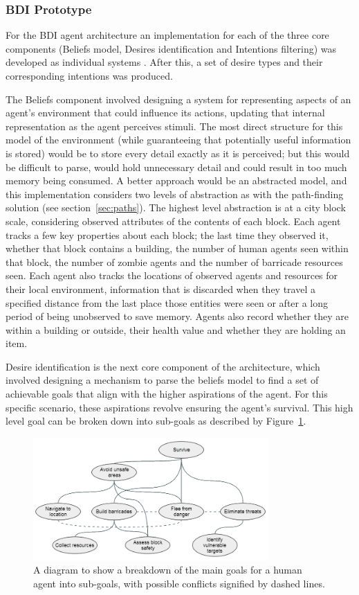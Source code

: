 \documentclass[a4paper,12pt]{article}
\begin{document}
\subsubsection{BDI Prototype}\noindent
For the BDI agent architecture an implementation for each of the three core components (Beliefs model, Desires identification and Intentions filtering) was developed as individual systems \cite{rao95}. After this, a set of desire types and their corresponding intentions was produced.

The Beliefs component involved designing a system for representing aspects of an agent's environment that could influence its actions, updating that internal representation as the agent perceives stimuli. The most direct structure for this model of the environment (while guaranteeing that potentially useful information is stored) would be to store every detail exactly as it is perceived; but this would be difficult to parse, would hold unnecessary detail and could result in too much memory being consumed. A better approach would be an abstracted model, and this implementation considers two levels of abstraction as with the path-finding solution (see section~\ref{sec:paths}). The highest level abstraction is at a city block scale, considering observed attributes of the contents of each block. Each agent tracks a few key properties about each block; the last time they observed it, whether that block contains a building, the number of human agents seen within that block, the number of zombie agents and the number of barricade resources seen. Each agent also tracks the locations of observed agents and resources for their local environment, information that is discarded when they travel a specified distance from the last place those entities were seen or after a long period of being unobserved to save memory. Agents also record whether they are within a building or outside, their health value and whether they are holding an item.

Desire identification is the next core component of the architecture, which involved designing a mechanism to parse the beliefs model to find a set of achievable goals that align with the higher aspirations of the agent. For this specific scenario, these aspirations revolve ensuring the agent's survival. This high level goal can be broken down into sub-goals as described by Figure~\ref{fig:goals}.

\label{sec:bdi}
\begin{figure}[h]
\centering
\includegraphics[width=0.8\textwidth]{goals}
\caption{A diagram to show a breakdown of the main goals for a human agent into sub-goals, with possible conflicts signified by dashed lines.}
\label{fig:goals}
\end{figure}
\end{document}
